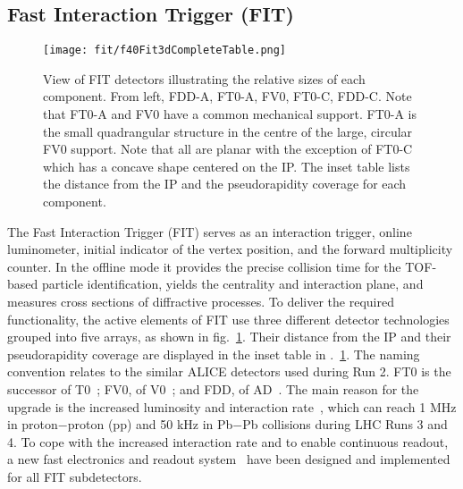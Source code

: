 

\subsection{Fast Interaction Trigger (FIT)}

\begin{figure}[htbp]
\begin{center}
\texttt{[image: fit/f40Fit3dCompleteTable.png]}
\caption{View of FIT detectors illustrating the relative sizes of each component.  From left, FDD-A, FT0-A, FV0, FT0-C, FDD-C.  Note that FT0-A and FV0 have a common mechanical support. FT0-A is the small quadrangular structure in the centre of the large, circular FV0 support. Note that all are planar with the exception of FT0-C which has a concave shape centered on the IP.  The inset table lists the distance from the IP and the pseudorapidity coverage for each component.  }
\label{FITschematic}
\end{center}
\end{figure}

The Fast Interaction Trigger (FIT)\cite{Trzaska:2017reu} serves as an interaction trigger, online luminometer, initial indicator of the vertex position, and the forward multiplicity counter. In the offline mode it provides the precise collision time for the TOF-based particle identification, yields the centrality and interaction plane, and measures cross sections of diffractive processes. To deliver the required functionality, the active elements of FIT use three different detector technologies grouped into five arrays, as shown in fig.~\ref{FITschematic}. Their distance from the IP and their pseudorapidity coverage are displayed in the inset table in .~\ref{FITschematic}. The naming convention relates to the similar ALICE detectors used during Run 2. FT0 is the successor of T0~\cite{Bondila:2005}; FV0, of V0~\cite{V0performance:2014}; and FDD, of AD~\cite{broz:2020mb}. The main reason for the upgrade is the increased luminosity and interaction rate~\cite{Trzaska:2020zzl}, which can reach 1 MHz in proton$-$proton (pp) and 50 kHz in Pb$-$Pb collisions during LHC Runs 3 and 4. To cope with the increased interaction rate and to enable continuous readout, a new fast electronics and readout system~\cite{Finogeev:2020qkf} have been designed and implemented for all FIT subdetectors.



